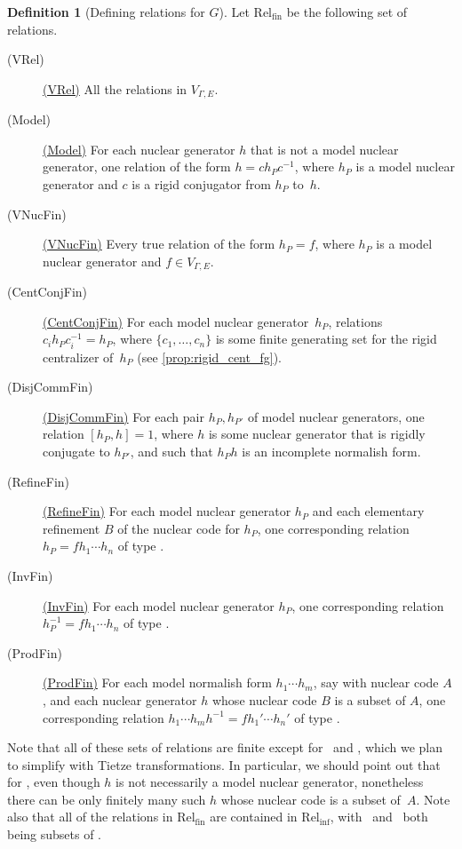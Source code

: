 \documentclass[11pt,letterpaper]{amsart}
\theoremstyle{definition}
\newtheorem{definition}[theorem]{Definition}
\newcommand{\Rel}{\mathrm{Rel}}
\newcommand{\listlabel}[1]{%
  \item[\quad(#1)]\hypertarget{#1}{}\global\expandafter\def\csname #1\endcsname{\hyperlink{#1}{(#1)}}}
\begin{document}
\begin{definition}[Defining relations for $G$]\label{def:RelFin}
Let $\Rel_{\mathrm{fin}}$ be the following set of relations.

\begin{description}
\listlabel{VRel} All the relations in $V_{\Gamma,E}$.\smallskip

\listlabel{Model} For each nuclear generator $h$ that is not a model nuclear generator, one relation of the form $h=ch_Pc^{-1}$, where $h_P$ is a model nuclear generator and $c$ is a rigid conjugator from $h_P$ to~$h$.\smallskip

\listlabel{VNucFin} Every true relation of the form $h_P=f$, where $h_P$ is a model nuclear generator and $f\in V_{\Gamma,E}$.\smallskip

\listlabel{CentConjFin} For each model nuclear generator~$h_P$, relations $c_ih_Pc_i^{-1}=h_P$, where $\{c_1,\ldots,c_n\}$ is some finite generating set for the rigid centralizer of~$h_P$ (see \cref{prop:rigid_cent_fg}).\smallskip

\listlabel{DisjCommFin} For each pair $h_P,h_{P'}$ of model nuclear generators, one relation $[h_P,h]=1$, where $h$ is some nuclear generator that is rigidly conjugate to $h_{P'}$, and such that $h_Ph$ is an incomplete normalish form.\smallskip

\listlabel{RefineFin} For each model nuclear generator $h_P$ and each elementary refinement $B$ of the nuclear code for $h_P$, one corresponding relation $h_P=fh_1\cdots h_n$ of type \Refine.\smallskip

\listlabel{InvFin} For each model nuclear generator $h_P$, one corresponding relation $h_P^{-1}=fh_1\cdots h_n$ of type \Inv.\smallskip

\listlabel{ProdFin} For each model normalish form $h_1\cdots h_m$, say with nuclear code $A$, and each nuclear generator $h$ whose nuclear code $B$ is a subset of $A$, one corresponding relation $h_1\cdots h_mh^{-1}=fh_1'\cdots h_n'$ of type \Prod.
\end{description}
\end{definition}

Note that all of these sets of relations are finite except for \VRel\ and \Model, which we plan to simplify with Tietze transformations.  In particular, we should point out that for \ProdFin, even though $h$ is not necessarily a model nuclear generator, nonetheless there can be only finitely many such $h$ whose nuclear code is a subset of~$A$.  Note also that all of the relations in $\Rel_{\mathrm{fin}}$ are contained in $\Rel_{\mathrm{inf}}$, with \Model\ and \CentConjFin\ both being subsets of \Conj.
\end{document}
